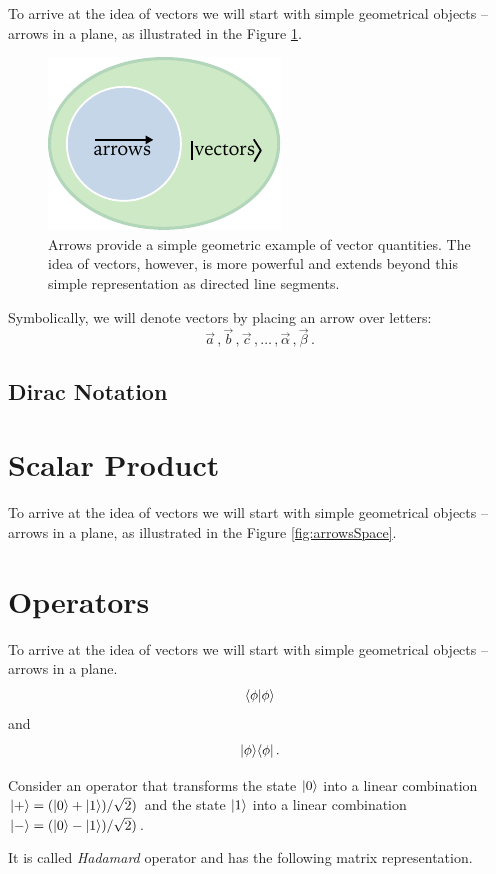To arrive at the idea of vectors we will start with simple geometrical
objects -- arrows in a plane, as illustrated in the Figure \ref{fig:arrowsAndVectors}.

\begin{figure}[htbp]
  \centering
  \includegraphics[scale=1.0]{arrowsAndVectors}
  \caption{Arrows provide a simple geometric example of vector quantities. The idea of vectors, however, is more powerful and extends beyond this simple representation as directed line segments.}
  \label{fig:arrowsAndVectors}
\end{figure}

Symbolically, we will denote vectors by placing an arrow over letters:
\[
\vec{a}\,,\vec{b}\,,\vec{c}\,,\ldots\,,\vec{\alpha}\,,\vec{\beta}\,.
\]

\subsection{Dirac Notation}

\section{Scalar Product}

To arrive at the idea of vectors we will start with simple geometrical
objects -- arrows in a plane, as illustrated in the Figure \ref{fig:arrowsSpace}.


\section{Operators}\label{sec:operators}

To arrive at the idea of vectors we will start with simple geometrical
objects -- arrows in a plane.
\[
\langle{\phi}|{\phi\rangle}
\]
and
\[
|{\phi}\rangle\langle{\phi}|\,.
\]
\begin{example}
	Consider an operator that transforms the state $|{0}\rangle$ into a linear combination $|{+}\rangle=(|{0}\rangle+|{1}\rangle)/\sqrt{2})$ and the state $|{1}\rangle$ into a linear combination $|{-}\rangle=(|{0}\rangle-|{1}\rangle)/\sqrt{2})$.
	
	It is called \emph{Hadamard} operator and has the following matrix representation.
\end{example}

